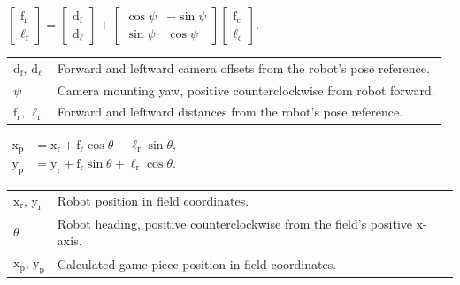 \documentclass[11pt]{article}
\newcommand{\vname}[1]{\text{#1}}
\newcommand{\sine}{\mathop{\vname{sin}}\nolimits}
\newcommand{\cosine}{\mathop{\vname{cos}}\nolimits}
\begin{document}
\begin{minipage}[t]{0.34\linewidth}
  \begin{minipage}[c][32mm][c]{\linewidth}
    \large
    \(\displaystyle
    \begin{bmatrix}\vname{f}_{\vname{r}}\\ \ell_{\vname{r}}\end{bmatrix}
    =
    \begin{bmatrix}\vname{d}_{\vname{f}}\\ \vname{d}_{\ell}\end{bmatrix}
    +
    \begin{bmatrix}
      \cosine\psi & -\sine\psi\\
      \sine\psi   & \cosine\psi
    \end{bmatrix}
    \begin{bmatrix}\vname{f}_{\vname{c}}\\ \ell_{\vname{c}}\end{bmatrix}.
    \)
  \end{minipage}\par
  \begin{tabularx}{\linewidth}{@{}l >{\raggedright\arraybackslash}X@{}}
    \(\vname{d}_{\vname{f}},\,\vname{d}_{\ell}\)
      & Forward and leftward camera offsets from the robot's pose reference. \\
    \(\psi\) & Camera mounting yaw, positive counterclockwise from robot forward. \\
    \(\vname{f}_{\vname{r}},\,\ell_{\vname{r}}\)
      & Forward and leftward distances from the robot's pose reference. \\
  \end{tabularx}
\end{minipage}\hfill
\begin{minipage}[t]{0.31\linewidth}
  \begin{minipage}[c][32mm][c]{\linewidth}
    \large
    \setlength{\fboxsep}{5pt}
    \(\displaystyle
    \boxed{\begin{aligned}
      \vname{x}_{\vname{p}} &= \vname{x}_{\vname{r}}
        + \vname{f}_{\vname{r}}\cosine\theta
        - \ell_{\vname{r}}\sine\theta,\\
      \vname{y}_{\vname{p}} &= \vname{y}_{\vname{r}}
        + \vname{f}_{\vname{r}}\sine\theta
        + \ell_{\vname{r}}\cosine\theta.
    \end{aligned}}
    \)
  \end{minipage}\par
  \begin{tabularx}{\linewidth}{@{}l >{\raggedright\arraybackslash}X@{}}
    \(\vname{x}_{\vname{r}},\,\vname{y}_{\vname{r}}\)
      & Robot position in field coordinates. \\
    \(\theta\) & Robot heading, positive counterclockwise from the field's
      positive \(\vname{x}\)-axis. \\
    \(\vname{x}_{\vname{p}},\,\vname{y}_{\vname{p}}\)
      & Calculated game piece position in field coordinates. \\
  \end{tabularx}
\end{minipage}
\end{document}
